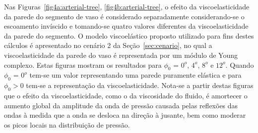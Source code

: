 \documentclass[
        english,			
        brazil			        %
        ,<...>]{abntbibufjf}
\begin{document}
Nas Figuras~\ref{fig4a:arterial-tree}, \ref{fig4b:arterial-tree}, o efeito da viscoelasticidade da parede do segmento de vaso é considerado separadamente considerando-se o escoamento invíscido e tomando-se quatro valores diferentes da viscoelasticidade da parede do segmento. O modelo viscoelástico proposto utilizado para fins destes cálculos é apresentado no cenário 2 da Seção~\ref{sec:cenario}, no qual a viscoelasticidade da parede do vaso é representada por um módulo de Young complexo. Estas figuras mostram os resultados para $\phi_0$ = $0^o$, $4^o$, $8^o$ e $12^o$. Quando $\phi_0$ = $0^o$ tem-se um valor representando uma parede puramente elástica e para $\phi_0> 0$ tem-se a representação da viscoelasticidade. Nota-se a partir destas figuras que o efeito da viscoelasticidade, como o da viscosidade do fluido, é amortecer o aumento global da amplitude da onda de pressão causada pelas reflexões das ondas à medida que a onda se desloca na direção à jusante, bem como moderar os picos locais na distribuição de pressão. 
\end{document}
